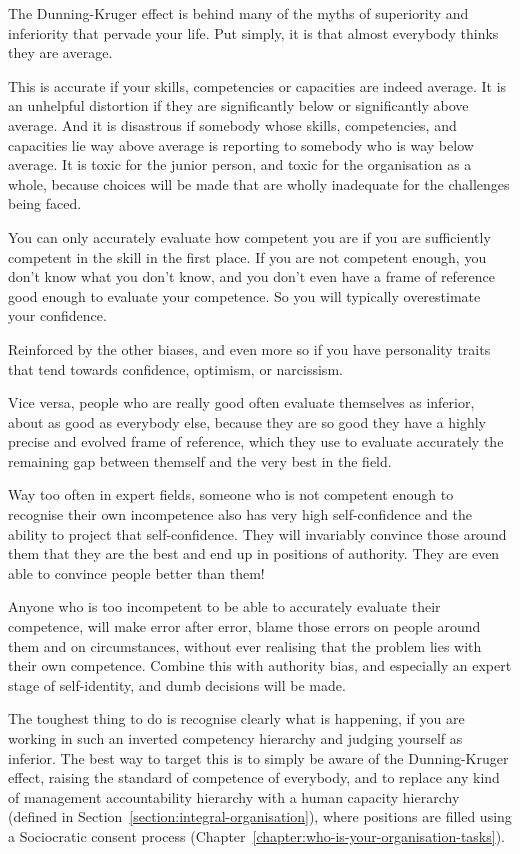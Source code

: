 The Dunning-Kruger effect is behind many of the myths of superiority and inferiority that pervade your life. Put simply, it is that almost everybody thinks they are average. 


This is accurate if your skills, competencies or capacities are indeed average. It is an unhelpful distortion if they are significantly below or significantly above average. And it is disastrous if somebody whose skills, competencies, and capacities lie way above average is reporting to somebody who is way below average. It is toxic for the junior person, and toxic for the organisation as a whole, because choices will be made that are wholly inadequate for the challenges being faced.


You can only accurately evaluate how competent you are if you are sufficiently competent in the skill in the first place. If you are not competent enough, you don't know what you don't know, and you don't even have a frame of reference good enough to evaluate your competence. So you will typically overestimate your confidence. 


Reinforced by the other biases, and even more so if you have personality traits that tend towards confidence, optimism, or narcissism.


Vice versa, people who are really good often evaluate themselves as inferior, about as good as everybody else, because they are so good they have a highly precise and evolved frame of reference, which they use to evaluate accurately the remaining gap between themself and the very best in the field.


Way too often in expert fields, someone who is not competent enough to recognise their own incompetence also has very high self-confidence and the ability to project that self-confidence. They will invariably convince those around them that they are the best and end up in positions of authority. They are even able to convince people better than them! 


Anyone who is too incompetent to be able to accurately evaluate their competence, will make error after error, blame those errors on people around them and on circumstances, without ever realising that the problem lies with their own competence. Combine this with authority bias, and especially an expert stage of self-identity, and dumb decisions will be made.


The toughest thing to do is recognise clearly what is happening, if you are working in such an inverted competency hierarchy and judging yourself as inferior. The best way to target this is to simply be aware of the Dunning-Kruger effect, raising the standard of competence of everybody\cite{dunning-beyond}, and to replace any kind of management accountability hierarchy with a human capacity hierarchy (defined in Section~\ref{section:integral-organisation}), where positions are filled using a Sociocratic consent process (Chapter~\ref{chapter:who-is-your-organisation-tasks}).




